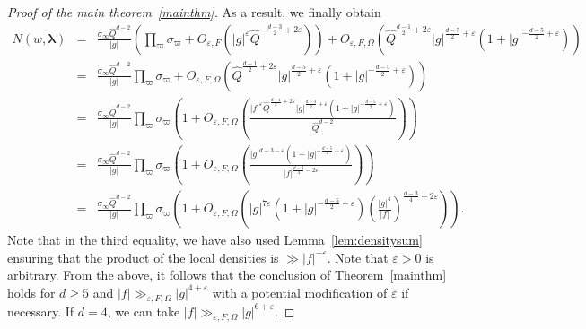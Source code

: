 \documentclass[10pt]{amsart}
\theoremstyle{plain}
\theoremstyle{plain}
\theoremstyle{remark}
\theoremstyle{definition}
\newcommand{\hQ}{\widehat{Q}}
\begin{document}
\begin{proof}[Proof of the main theorem~\ref{mainthm}]
As a result, we finally obtain
\begin{eqnarray*}N(w,\boldsymbol{\lambda})&=&\frac{\sigma_{\infty}\hQ^{d-2}}{|g|}\left(\prod_{\varpi}\sigma_{\varpi}+O_{\varepsilon,F}\left(|g|^{\varepsilon}\hQ^{-\frac{d-3}{2}+2\varepsilon}\right)\right)+O_{\varepsilon,F,\Omega}\left(\hQ^{\frac{d-1}{2}+2\varepsilon}|g|^{\frac{d-5}{2}+\varepsilon}(1+|g|^{-\frac{d-5}{2}+\varepsilon})\right)\\&=&\frac{\sigma_{\infty}\hQ^{d-2}}{|g|}\prod_{\varpi}\sigma_{\varpi}+O_{\varepsilon,F,\Omega}\left(\hQ^{\frac{d-1}{2}+2\varepsilon}|g|^{\frac{d-5}{2}+\varepsilon}(1+|g|^{-\frac{d-5}{2}+\varepsilon})\right)\\&=& \frac{\sigma_{\infty}\hQ^{d-2}}{|g|}\prod_{\varpi}\sigma_{\varpi}\left(1+O_{\varepsilon,F,\Omega}\left(\frac{|f|^{\varepsilon}\hQ^{\frac{d-1}{2}+2\varepsilon}|g|^{\frac{d-3}{2}+\varepsilon}(1+|g|^{-\frac{d-5}{2}+\varepsilon})}{\hQ^{d-2}}\right)\right)\\&=&\frac{\sigma_{\infty}\hQ^{d-2}}{|g|}\prod_{\varpi}\sigma_{\varpi}\left(1+O_{\varepsilon,F,\Omega}\left(\frac{|g|^{d-3-\varepsilon}(1+|g|^{-\frac{d-5}{2}+\varepsilon})}{|f|^{\frac{d-3}{4}-2\varepsilon}}\right)\right)\\&=& \frac{\sigma_{\infty}\hQ^{d-2}}{|g|}\prod_{\varpi}\sigma_{\varpi}\left(1+O_{\varepsilon,F,\Omega}\left(|g|^{7\varepsilon}(1+|g|^{-\frac{d-5}{2}+\varepsilon})\left(\frac{|g|^{4}}{|f|}\right)^{\frac{d-3}{4}-2\varepsilon}\right)\right).\end{eqnarray*}
Note that in the third equality, we have also used Lemma~\ref{lem:densitysum} ensuring that the product of the local densities is $\gg |f|^{-\varepsilon}$. Note that $\varepsilon>0$ is arbitrary. From the above, it follows that the conclusion of Theorem~\ref{mainthm} holds for $d\geq 5$ and $|f|\gg_{\varepsilon,F,\Omega} |g|^{4+\varepsilon}$ with a potential modification of $\varepsilon$ if necessary. If $d=4$, we can take $|f|\gg_{\varepsilon,F,\Omega} |g|^{6+\varepsilon}$.
\end{proof}
\end{document}

